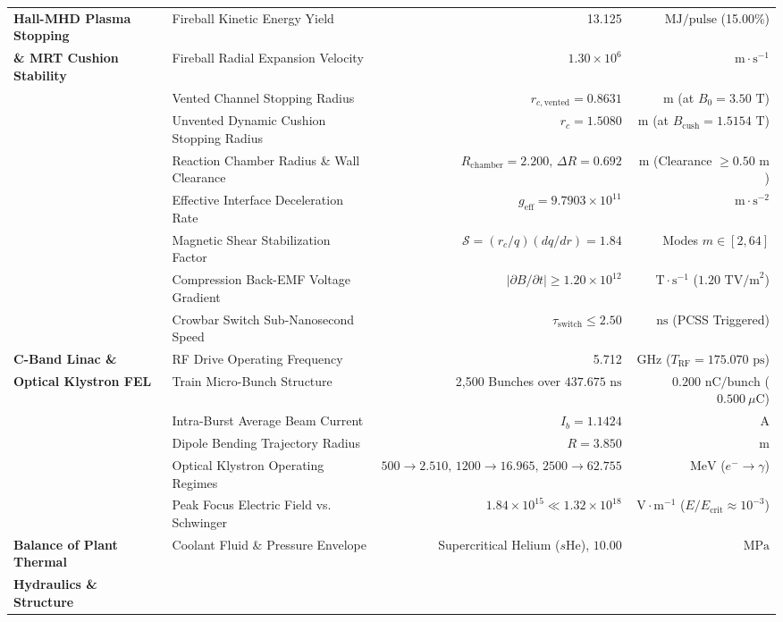 \documentclass[11pt,journal,compsoc]{IEEEtran}
\begin{document}
\begin{table}[t]
{\begin{tabular}{llrr}
\hline
\textbf{Hall-MHD Plasma Stopping} 
& Fireball Kinetic Energy Yield & 13.125 & $\text{MJ/pulse}$ (15.00\%) \\
\textbf{\& MRT Cushion Stability} 
& Fireball Radial Expansion Velocity & $1.30\times 10^{6}$ & $\text{m}\cdot\text{s}^{-1}$ \\
& Vented Channel Stopping Radius & $r_{c, \text{vented}} = 0.8631$ & $\text{m}$ (at $B_0 = 3.50\text{ T}$) \\
& Unvented Dynamic Cushion Stopping Radius & $r_c = 1.5080$ & $\text{m}$ (at $B_{\text{cush}} = 1.5154\text{ T}$) \\
& Reaction Chamber Radius \& Wall Clearance & $R_{\text{chamber}} = 2.200,\, \Delta R = 0.692$ & $\text{m}$ (Clearance $\ge 0.50\text{ m}$) \\
& Effective Interface Deceleration Rate & $g_{\text{eff}} = 9.7903\times 10^{11}$ & $\text{m}\cdot\text{s}^{-2}$ \\
& Magnetic Shear Stabilization Factor & $\mathcal{S} = (r_c/q)(dq/dr) = 1.84$ & Modes $m \in [2, 64]$ \\
& Compression Back-EMF Voltage Gradient & $|\partial B/\partial t| \ge 1.20\times 10^{12}$ & $\text{T}\cdot\text{s}^{-1}$ ($1.20\text{ TV/m}^2$) \\
& Crowbar Switch Sub-Nanosecond Speed & $\tau_{\text{switch}} \le 2.50$ & $\text{ns}$ (PCSS Triggered) \\
\hline
\textbf{C-Band Linac \&} 
& RF Drive Operating Frequency & 5.712 & $\text{GHz}$ ($T_{\text{RF}} = 175.070\text{ ps}$) \\
\textbf{Optical Klystron FEL} 
& Train Micro-Bunch Structure & 2,500 Bunches over $437.675\text{ ns}$ & $0.200\text{ nC/bunch}$ ($0.500\ \mu\text{C}$) \\
& Intra-Burst Average Beam Current & $I_b = 1.1424$ & $\text{A}$ \\
& Dipole Bending Trajectory Radius & $R = 3.850$ & $\text{m}$ \\
& Optical Klystron Operating Regimes & $500 \to 2.510,\, 1200 \to 16.965,\, 2500 \to 62.755$ & $\text{MeV}$ ($e^- \to \gamma$) \\
& Peak Focus Electric Field vs. Schwinger & $1.84\times 10^{15} \ll 1.32\times 10^{18}$ & $\text{V}\cdot\text{m}^{-1}$ ($E / E_{\text{crit}} \approx 10^{-3}$) \\
\hline
\textbf{Balance of Plant Thermal} 
& Coolant Fluid \& Pressure Envelope & Supercritical Helium ($s\text{He}$), $10.00$ & $\text{MPa}$ \\
\textbf{Hydraulics \& Structure} 

\end{tabular}}
\end{table}
\end{document}
